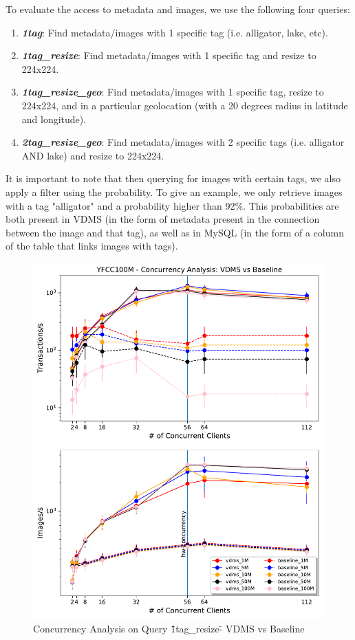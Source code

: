 To evaluate the access to metadata and images,
we use the following four queries:
\begin{enumerate}
\item {\bf {\em 1tag}}: Find metadata/images with 1 specific tag (i.e. alligator, lake, etc).
\item {\bf {\em 1tag\_resize}}: Find metadata/images with 1 specific tag and resize to 224x224.
\item {\bf {\em 1tag\_resize\_geo}}: Find metadata/images with 1 specific tag, resize to 224x224, and in a particular geolocation (with a 20 degrees radius in latitude and longitude).
\item {\bf {\em 2tag\_resize\_geo}}: Find metadata/images with 2 specific tags (i.e. alligator AND lake) and resize to 224x224.
\end{enumerate}

It is important to note that then querying for images with certain tags, we
also apply a filter using the probability. To give an example, we only retrieve
images with a tag "alligator" and a probability higher than 92\%.
This probabilities are both present in VDMS (in the form of metadata present
in the connection between the image and that tag), as well as in MySQL (in
the form of a column of the table that links images with tags).

\begin{figure}[]
\centering
\includegraphics[width=\columnwidth]{figures/concurrency_comparison}
\caption{Concurrency Analysis on Query \"1tag\_resize\"- VDMS vs Baseline}
\label{fig:concurrency_vdms}
\end{figure}


